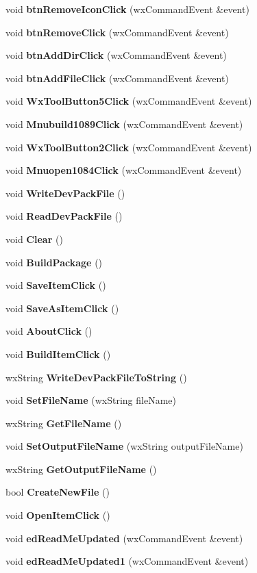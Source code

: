 \begin{CompactItemize}
\item 
void {\bf btn\-Remove\-Icon\-Click} (wx\-Command\-Event \&event)
\item 
void {\bf btn\-Remove\-Click} (wx\-Command\-Event \&event)
\item 
void {\bf btn\-Add\-Dir\-Click} (wx\-Command\-Event \&event)
\item 
void {\bf btn\-Add\-File\-Click} (wx\-Command\-Event \&event)
\item 
void {\bf Wx\-Tool\-Button5Click} (wx\-Command\-Event \&event)
\item 
void {\bf Mnubuild1089Click} (wx\-Command\-Event \&event)
\item 
void {\bf Wx\-Tool\-Button2Click} (wx\-Command\-Event \&event)
\item 
void {\bf Mnuopen1084Click} (wx\-Command\-Event \&event)
\item 
void {\bf Write\-Dev\-Pack\-File} ()
\item 
void {\bf Read\-Dev\-Pack\-File} ()
\item 
void {\bf Clear} ()
\item 
void {\bf Build\-Package} ()
\item 
void {\bf Save\-Item\-Click} ()
\item 
void {\bf Save\-As\-Item\-Click} ()
\item 
void {\bf About\-Click} ()
\item 
void {\bf Build\-Item\-Click} ()
\item 
wx\-String {\bf Write\-Dev\-Pack\-File\-To\-String} ()
\item 
void {\bf Set\-File\-Name} (wx\-String file\-Name)
\item 
wx\-String {\bf Get\-File\-Name} ()
\item 
void {\bf Set\-Output\-File\-Name} (wx\-String output\-File\-Name)
\item 
wx\-String {\bf Get\-Output\-File\-Name} ()
\item 
bool {\bf Create\-New\-File} ()
\item 
void {\bf Open\-Item\-Click} ()
\item 
void {\bf ed\-Read\-Me\-Updated} (wx\-Command\-Event \&event)
\item 
void {\bf ed\-Read\-Me\-Updated1} (wx\-Command\-Event \&event)
\end{CompactItemize}
